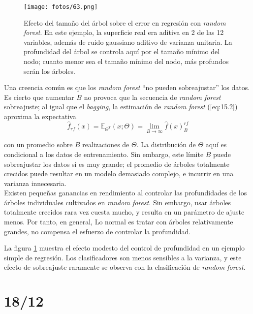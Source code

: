 \begin{figure}[H]
\centering
\texttt{[image: fotos/63.png]}
\caption{Efecto del tamaño del árbol sobre el error en regresión con \textit{random forest}. En este ejemplo, la superficie real era aditiva en 2 de las 12 variables, además de ruido gaussiano aditivo de varianza unitaria. La profundidad del árbol se controla aquí por el tamaño mínimo del nodo; cuanto menor sea el tamaño mínimo del nodo, más profundos serán los árboles.}
\label{fig:20.18}
\end{figure}

Una creencia común es que los \textit{random forest} ``no pueden sobreajustar'' los datos. Es cierto que aumentar $B$ no provoca que la secuencia de \textit{random forest} sobreajuste; al igual que el \textit{bagging}, la estimación de \textit{random forest} (\ref{eq:15.2}) aproxima la expectativa
\begin{equation}
\hat{f}_{rf} (x) = \mathbb{E}_{\Theta^T} (x; \Theta) = \lim_{B \to \infty} \hat{f} (x)_B^{rf}
\end{equation}

con un promedio sobre $B$ realizaciones de $\Theta$. La distribución de $\Theta$ aquí es condicional a los datos de entrenamiento. Sin embargo, este límite $B$ puede sobreajustar los datos si es muy grande; el promedio de árboles totalmente crecidos puede resultar en un modelo demasiado complejo, e
incurrir en una varianza innecesaria. \\

Existen pequeñas ganancias en rendimiento al controlar las profundidades de los árboles individuales cultivados en \textit{random forest}. Sin embargo, usar árboles totalmente crecidos rara vez cuesta mucho, y resulta en un parámetro de ajuste menos. Por tanto, en general, Lo normal es tratar con árboles relativamente grandes, no compensa el esfuerzo de controlar la profundidad.

La figura \ref{fig:20.18} muestra el efecto modesto del control de profundidad en un ejemplo simple de regresión. Los clasificadores son menos sensibles a la varianza, y este efecto de sobreajuste raramente se observa con la clasificación de \textit{random forest}. 




\section{18/12}

